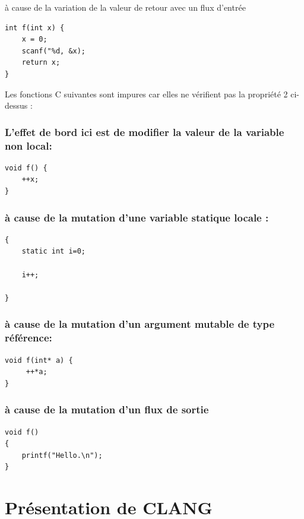 \documentclass[12pt,titlepage]{article}
\begin{document}
à cause de la variation de la valeur de retour avec un flux d'entrée

\begin{lstlisting}
int f(int x) {
    x = 0;
    scanf("%d, &x);
    return x;
}
\end{lstlisting}

Les fonctions C suivantes sont impures car elles ne vérifient pas la propriété 2 ci-dessus :

\subsubsection{L'effet de bord ici est de modifier la valeur de la variable non local:}

\begin{lstlisting}
void f() {
    ++x;
}
\end{lstlisting}

\subsubsection{ à cause de la mutation d'une variable statique locale :}

\begin{lstlisting}
{
    static int i=0; 

    i++;
    
}
\end{lstlisting}



\subsubsection{à cause de la mutation d'un argument mutable de type référence:}

\begin{lstlisting}
void f(int* a) {
     ++*a;
}
\end{lstlisting}

\subsubsection {à cause de la mutation d'un flux de sortie}

\begin{lstlisting}
void f()
{
    printf("Hello.\n");
}
\end{lstlisting}

\section{Présentation de CLANG \cite{clangllvm} } 
\end{document}
